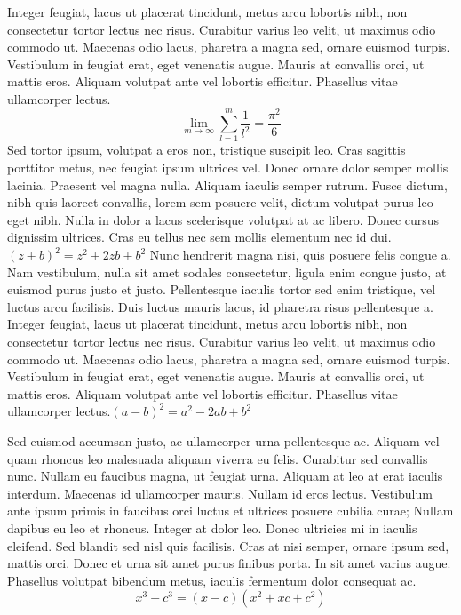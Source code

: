 \documentclass{article}
\begin{document}
 Integer feugiat, lacus ut placerat tincidunt, metus arcu lobortis nibh, non consectetur tortor lectus nec risus. Curabitur varius leo velit, ut maximus odio commodo ut. Maecenas odio lacus, pharetra a magna sed, ornare euismod turpis. Vestibulum in feugiat erat, eget venenatis augue. Mauris at convallis orci, ut mattis eros. Aliquam volutpat ante vel lobortis efficitur. Phasellus vitae ullamcorper lectus.
$$
\lim_{m \to \infty}
\sum_{l=1}^m \frac{1}{l^2}
= \frac{\pi^2}{6}
$$
Sed tortor ipsum, volutpat a eros non, tristique suscipit leo. Cras sagittis porttitor metus, nec feugiat ipsum ultrices vel. Donec ornare dolor semper mollis lacinia. Praesent vel magna nulla. Aliquam iaculis semper rutrum. Fusce dictum, nibh quis laoreet convallis, lorem sem posuere velit, dictum volutpat purus leo eget nibh. Nulla in dolor a lacus scelerisque volutpat at ac libero. Donec cursus dignissim ultrices. Cras eu tellus nec sem mollis elementum nec id dui.
\(
(z+b)^{2}=z^{2}+2zb+b^{2}
\)
Nunc hendrerit magna nisi, quis posuere felis congue a. Nam vestibulum, nulla sit amet sodales consectetur, ligula enim congue justo, at euismod purus justo et justo. Pellentesque iaculis tortor sed enim tristique, vel luctus arcu facilisis. Duis luctus mauris lacus, id pharetra risus pellentesque a. Integer feugiat, lacus ut placerat tincidunt, metus arcu lobortis nibh, non consectetur tortor lectus nec risus. Curabitur varius leo velit, ut maximus odio commodo ut. Maecenas odio lacus, pharetra a magna sed, ornare euismod turpis. Vestibulum in feugiat erat, eget venenatis augue. Mauris at convallis orci, ut mattis eros. Aliquam volutpat ante vel lobortis efficitur. Phasellus vitae ullamcorper lectus.$(a-b)^{2}=a^{2}-2ab+b^{2} $

Sed euismod accumsan justo, ac ullamcorper urna pellentesque ac. Aliquam vel quam rhoncus leo malesuada aliquam viverra eu felis. Curabitur sed convallis nunc. Nullam eu faucibus magna, ut feugiat urna. Aliquam at leo at erat iaculis interdum. Maecenas id ullamcorper mauris. Nullam id eros lectus. Vestibulum ante ipsum primis in faucibus orci luctus et ultrices posuere cubilia curae; Nullam dapibus eu leo et rhoncus. Integer at dolor leo. Donec ultricies mi in iaculis eleifend. Sed blandit sed nisl quis facilisis. Cras at nisi semper, ornare ipsum sed, mattis orci. Donec et urna sit amet purus finibus porta. In sit amet varius augue. Phasellus volutpat bibendum metus, iaculis fermentum dolor consequat ac.
$$ x^{3} - c^{3} = (x-c)(x^{2}+xc+c^{2}) $$
\end{document}
